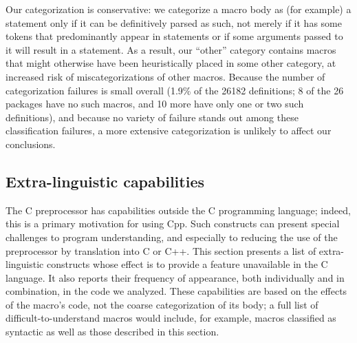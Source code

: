 \documentclass[10pt]{article}
\def\numpackages{26}
\def\nummacrodefs{26182}        %
\begin{document}
\begin{description}
  Our categorization is conservative:
  we categorize a macro body as (for example) a statement only if it can be
  definitively parsed as such, not merely if it has some tokens that
  predominantly appear in statements or if some arguments passed to it will
  result in a statement.  As a result, our ``other'' category contains
  macros that might otherwise have been heuristically placed in some other category, at
  increased risk of miscategorizations of other macros.  Because the number
  of categorization failures is small overall (1.9\% of the {\nummacrodefs}
  definitions; 8 of the {\numpackages} packages have no such macros, and 10
  more have only one or two such definitions), and because no variety of
  failure stands out among these classification failures, a more extensive
  categorization is unlikely to affect our conclusions.

\end{description}







\subsection{Extra-linguistic capabilities}
\label{sec:extra-linguistic}

The C preprocessor has capabilities outside the C programming language;
indeed, this is a primary motivation for using Cpp.  Such constructs can
present special challenges to program understanding, and especially to
reducing the use of the preprocessor by translation into C or C++.  This
section presents a list of extra-linguistic constructs whose effect is to
provide a feature unavailable in the C language.  It also reports their
frequency of appearance, both individually and in combination, in the code we analyzed.
These capabilities are based on the effects of the macro's code,
not the coarse categorization of its body; a full list of
difficult-to-understand macros would include, for example, macros classified as
syntactic as well as those described in this section.
\end{document}
